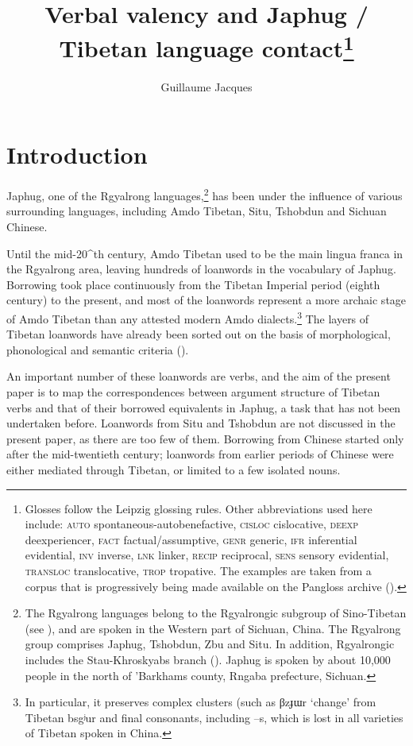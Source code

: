 \documentclass[oldfontcommands,oneside,a4paper,11pt]{article}
\newcommand{\ipa}[1]{{\phon \mbox{#1}}} %
\begin{document}
 
\title{Verbal valency and Japhug / Tibetan language contact\footnote{Glosses follow the Leipzig glossing rules. Other abbreviations used here include: \textsc{auto} spontaneous-autobenefactive, \textsc{cisloc} cislocative,  \textsc{deexp} deexperiencer, \textsc{fact} factual/assumptive, \textsc{genr} generic, \textsc{ifr} inferential evidential,  \textsc{inv} inverse, \textsc{lnk} linker, \textsc{recip} reciprocal, \textsc{sens} sensory  evidential, \textsc{transloc} translocative, \textsc{trop} tropative.   The examples are taken from a corpus that is progressively being made available on the Pangloss archive (\citealt{michailovsky14pangloss}). }}
\author{Guillaume Jacques}
\maketitle
\linenumbers


\section{Introduction}
Japhug, one of the Rgyalrong languages,\footnote{The Rgyalrong languages belong to the Rgyalrongic subgroup of Sino-Tibetan (see \citealt{jackson00puxi}), and are spoken in the Western part of Sichuan, China. The Rgyalrong group comprises Japhug, Tshobdun, Zbu and Situ. In addition, Rgyalrongic includes the Stau-Khroskyabs branch (\citealt{lai14person}). Japhug is spoken by about 10,000 people in the north of 'Barkhams county, Rngaba prefecture, Sichuan. } has been under the influence of various surrounding languages, including Amdo Tibetan, Situ, Tshobdun and Sichuan Chinese. 

Until the mid-20^{th} century, Amdo Tibetan used to be the main lingua franca in the Rgyalrong area, leaving hundreds of loanwords in the vocabulary of Japhug. Borrowing took place continuously from the Tibetan Imperial period (eighth century) to the present, and most of the loanwords represent a more archaic stage of Amdo Tibetan  than any attested modern Amdo dialects.\footnote{In particular, it preserves complex clusters (such as \ipa{βzɟɯr} `change' from Tibetan \ipa{bsgʲur} and final consonants, including \ipa{--s}, which is lost in all varieties of Tibetan spoken in China.} The layers of Tibetan loanwords have already been sorted out on the basis of morphological, phonological and semantic criteria (\citealt[83-200]{jacques04these}).

An important number of these loanwords are verbs, and the aim of the present paper is to map the correspondences between argument structure of Tibetan verbs and that of their borrowed equivalents in Japhug, a task that has not been undertaken before. Loanwords from Situ and Tshobdun are not discussed in the present paper, as there are too few of them. Borrowing from Chinese started only after the mid-twentieth century; loanwords from earlier periods of Chinese were either mediated through Tibetan, or limited to a few isolated nouns.
\end{document}
